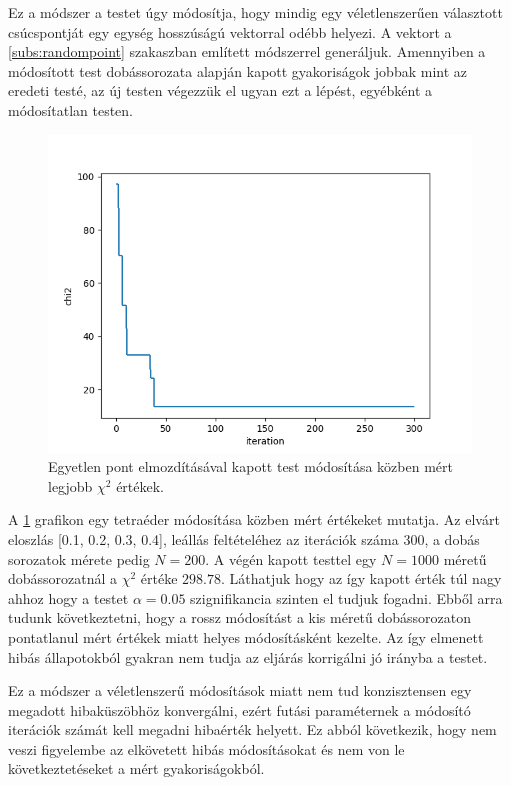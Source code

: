 \label{sect:randmodification}

Ez a módszer a testet úgy módosítja, hogy mindig egy véletlenszerűen választott csúcspontját egy egység hosszúságú vektorral odébb helyezi.
A vektort a \ref{subs:randompoint} szakaszban említett módszerrel generáljuk.
Amennyiben a módosított test dobássorozata alapján kapott gyakoriságok jobbak mint az eredeti testé, az új testen végezzük el ugyan ezt a lépést, egyébként a módosítatlan testen.
\begin{figure}[h!]
	\centering
	\includegraphics[scale=0.7]{images/randmodify_chi2.png}
	\caption{Egyetlen pont elmozdításával kapott test módosítása közben mért legjobb $\chi^2$ értékek.}
	\label{fig:randmodify_chi2}
\end{figure}
A \ref{fig:randmodify_chi2} grafikon egy tetraéder módosítása közben mért értékeket mutatja.
Az elvárt eloszlás [0.1, 0.2, 0.3, 0.4], leállás feltételéhez az iterációk száma $300$, a dobás sorozatok mérete pedig $N=200$.
A végén kapott testtel egy $N=1000$ méretű dobássorozatnál a $\chi^2$ értéke $298.78$.
Láthatjuk hogy az így kapott érték túl nagy ahhoz hogy a testet $\alpha = 0.05$ szignifikancia szinten el tudjuk fogadni.
Ebből arra tudunk következtetni, hogy a rossz módosítást a kis méretű dobássorozaton pontatlanul mért értékek miatt helyes módosításként kezelte.
Az így elmenett hibás állapotokból gyakran nem tudja az eljárás korrigálni jó irányba a testet.

Ez a módszer a véletlenszerű módosítások miatt nem tud konzisztensen egy megadott hibaküszöbhöz konvergálni, ezért futási paraméternek a módosító iterációk számát kell megadni hibaérték helyett.
Ez abból következik, hogy nem veszi figyelembe az elkövetett hibás módosításokat és nem von le következtetéseket a mért gyakoriságokból.

